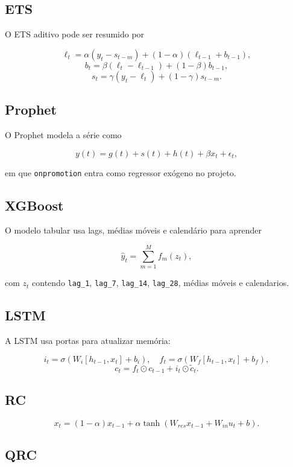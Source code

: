 \documentclass[12pt]{article}
\begin{document}
\subsection{ETS}\label{42-ets}

O ETS aditivo pode ser resumido por

\[
\ell_t = \alpha (y_t - s_{t-m}) + (1 - \alpha)(\ell_{t-1} + b_{t-1}),
\]
\[
b_t = \beta (\ell_t - \ell_{t-1}) + (1 - \beta) b_{t-1},
\]
\[
s_t = \gamma (y_t - \ell_t) + (1 - \gamma) s_{t-m}.
\]

\subsection{Prophet}\label{43-prophet}

O Prophet modela a série como

\[
y(t) = g(t) + s(t) + h(t) + \beta x_t + \epsilon_t,
\]

em que \texttt{onpromotion} entra como regressor exógeno no projeto.

\subsection{XGBoost}\label{44-xgboost}

O modelo tabular usa lags, médias móveis e calendário para aprender

\[
\hat{y}_t = \sum_{m=1}^M f_m(z_t),
\]

com \(z_t\) contendo \texttt{lag\_1}, \texttt{lag\_7}, \texttt{lag\_14}, \texttt{lag\_28}, médias móveis e calendarios.

\subsection{LSTM}\label{45-lstm}

A LSTM usa portas para atualizar memória:

\[
i_t = \sigma(W_i [h_{t-1}, x_t] + b_i), \quad
f_t = \sigma(W_f [h_{t-1}, x_t] + b_f),
\]
\[
c_t = f_t \odot c_{t-1} + i_t \odot \tilde{c}_t.
\]

\subsection{RC}\label{46-rc}

\[
x_t = (1 - \alpha) x_{t-1} + \alpha \tanh(W_{res} x_{t-1} + W_{in} u_t + b).
\]

\subsection{QRC}\label{47-qrc}
\end{document}
